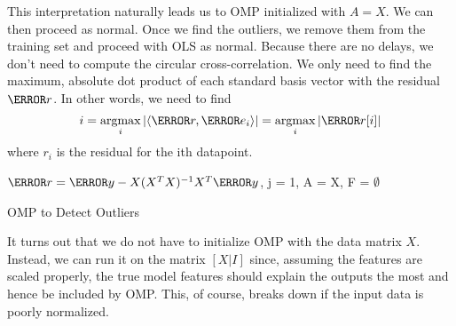   This interpretation naturally leads us to OMP initialized with $A = X$. We can then proceed as normal.
  Once we find the outliers, we remove them from the training set and proceed with OLS as normal.
  Because there are no delays, we don't need to compute the circular cross-correlation. 
  We only need to find the maximum, absolute dot product of each standard basis vector with the residual $\V{r}$. In other words, we need to find
  \[
	i = \argmax_{i} |\langle \V{r}, \V{e_i} \rangle| = \argmax_{i}|\V{r}[i]|
  \]
  where $r_i$ is the residual for the ith datapoint.
  \begin{algorithm}[!h]	
	\SetAlgoLined
	$\V{r} = \V{y} - X(X^TX)^{-1}X^T\V{y}$, j = 1, A = X, F = $\emptyset$\;
	\caption{OMP to Detect Outliers}
	\label{code:omp}
  \end{algorithm}

  It turns out that we do not have to initialize OMP with the data matrix $X$.
  Instead, we can run it on the matrix $[X | I]$ since, assuming the features are scaled properly, the true model features should explain the outputs the most and hence be included by OMP.
  This, of course, breaks down if the input data is poorly normalized.


